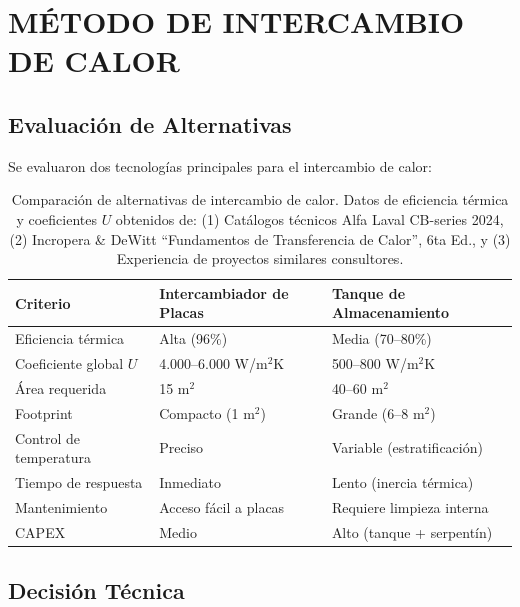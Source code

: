 \documentclass[12pt,a4paper]{article}
\begin{document}

\newpage

\section{MÉTODO DE INTERCAMBIO DE CALOR}

\subsection{Evaluación de Alternativas}

Se evaluaron dos tecnologías principales para el intercambio de calor:

\begin{table}[h]
\centering
\caption{Comparación de alternativas de intercambio de calor. Datos de eficiencia térmica y coeficientes $U$ obtenidos de: (1) Catálogos técnicos Alfa Laval CB-series 2024, (2) Incropera \& DeWitt ``Fundamentos de Transferencia de Calor'', 6ta Ed., y (3) Experiencia de proyectos similares consultores.}
\label{tab:comparacion_intercambiadores}
\small
\begin{tabular}{p{3.5cm}p{4.5cm}p{4.5cm}}
\toprule
\textbf{Criterio} & \textbf{Intercambiador de Placas} & \textbf{Tanque de Almacenamiento} \\
\midrule
Eficiencia térmica & Alta (96\%) & Media (70--80\%) \\
Coeficiente global $U$ & 4.000--6.000 W/m$^2$K & 500--800 W/m$^2$K \\
Área requerida & 15 m$^2$ & 40--60 m$^2$ \\
Footprint & Compacto (1 m$^2$) & Grande (6--8 m$^2$) \\
Control de temperatura & Preciso & Variable (estratificación) \\
Tiempo de respuesta & Inmediato & Lento (inercia térmica) \\
Mantenimiento & Acceso fácil a placas & Requiere limpieza interna \\
CAPEX & Medio & Alto (tanque + serpentín) \\
\bottomrule
\end{tabular}
\end{table}

\subsection{Decisión Técnica}
\end{document}

